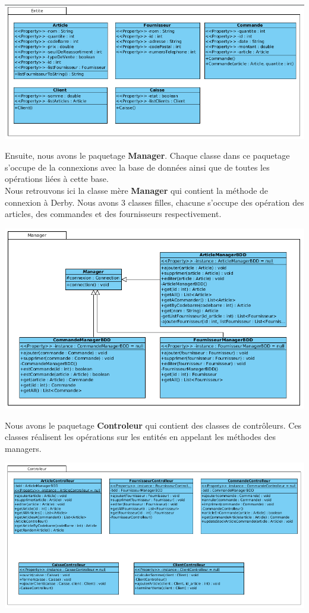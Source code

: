 \begin{center}
\includegraphics[width=14cm]{./Conception/entite}
\end{center}

Ensuite, nous avons le paquetage \textbf{Manager}. Chaque classe dans ce paquetage s'occupe de la connexions avec la base de données ainsi que de toutes les opérations liées à cette base.\\
Nous retrouvons ici la classe mère \textbf{Manager} qui contient la méthode de connexion à Derby. Nous avons 3 classes filles, chacune s'occupe des opération des articles, des commandes et des fournisseurs respectivement.

\begin{center}
\includegraphics[width=14cm]{./Conception/manager}
\end{center}

Nous avons le paquetage \textbf{Controleur} qui contient des classes de contrôleurs. Ces classes réalisent les opérations sur les entités en appelant les méthodes des managers.

\begin{center}
\includegraphics[width=14cm]{./Conception/controlleur}
\end{center}

